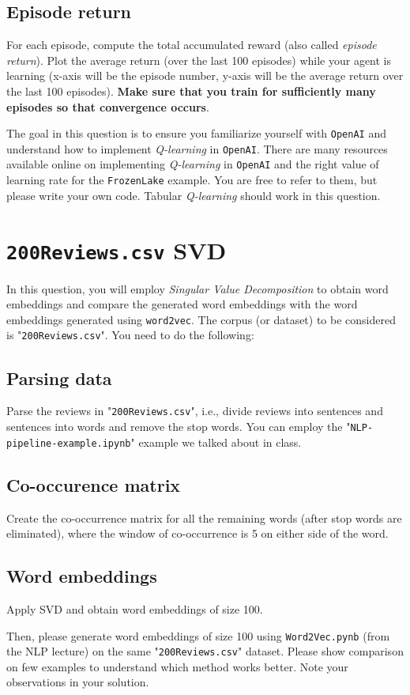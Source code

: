 \documentclass[12pt, letterpaper]{article}
\newcommand{\mybox}[1]{\par\noindent\colorbox{shadecolor}
{\parbox{\dimexpr\textwidth-2\fboxsep\relax}{#1}}}
\begin{document}
\subsection{Episode return}
\mybox{For each episode, compute the total accumulated reward (also called \textit{episode return}). Plot the average return (over the last 100 episodes) while your agent is learning (x-axis will be the episode number, y-axis will be the average return over the last 100 episodes). \textbf{Make sure that you train for sufficiently many episodes so that convergence occurs}.

The goal in this question is to ensure you familiarize yourself with \texttt{OpenAI} and understand how to implement \textit{Q-learning} in \texttt{OpenAI}. 
There are many resources available online on implementing \textit{Q-learning} in \texttt{OpenAI} and the right value of learning rate for the \texttt{FrozenLake} example.
You are free to refer to them, but please write your own code. 
Tabular \textit{Q-learning} should work in this question.}

\section{\texttt{200Reviews.csv} SVD}

\mybox{In this question, you will employ \textit{Singular Value Decomposition} to obtain word embeddings and compare the generated word embeddings with the word embeddings generated using \texttt{word2vec}. 
The corpus (or dataset) to be considered is "\texttt{200Reviews.csv}". You need to do the following:}

\subsection{Parsing data}
\mybox{Parse the reviews in "\texttt{200Reviews.csv}", i.e., divide reviews into sentences and sentences into words and remove the stop words. You can employ the "\texttt{NLP-pipeline-example.ipynb}" example we talked about in class.}

\subsection{Co-occurence matrix}
\mybox{Create the co-occurrence matrix for all the remaining words (after stop words are eliminated), where the window of co-occurrence is 5 on either side of the word.}

\subsection{Word embeddings}
\mybox{Apply SVD and obtain word embeddings of size 100.  

Then, please generate word embeddings of size 100 using \texttt{Word2Vec.pynb} (from the NLP lecture) on the same "\texttt{200Reviews.csv}" dataset. 
Please show comparison on few examples to understand which method works better. 
Note your observations in your solution.}
\end{document}
